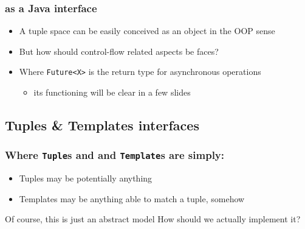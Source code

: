 \documentclass[presentation]{beamer}\mode<presentation>{\usetheme{AMSCesenaPurpleAndGold}}
\begin{document}
\begin{frame}%
\frametitle{\linda{} as a Java interface}

\begin{itemize}
	\item A tuple space can be easily conceived as an \alert{object} in the OOP sense
	
	\vfill
	
	\item But how should control-flow related aspects be faces?
\end{itemize}

\vfill



\vfill

\begin{itemize}
	\item Where \texttt{Future<X>} is the return type for \alert{asynchronous} operations
	\begin{itemize}
		\item its functioning will be clear in a few slides
	\end{itemize}
\end{itemize}
\end{frame}

\subsection{Tuples \& Templates interfaces} 

\begin{frame}%
\frametitle{Where \texttt{Tuple}s and and \texttt{Template}s are simply:}

\columnsHH{

}{

}

\begin{itemize}
\item Tuples may be potentially anything



\item Templates may be anything able to match a tuple, somehow
\end{itemize}

\vfill

\begin{block}{Of course, this is just an abstract model}
How should we \alert{actually} implement it?
\end{block}

\end{frame}
\end{document}
